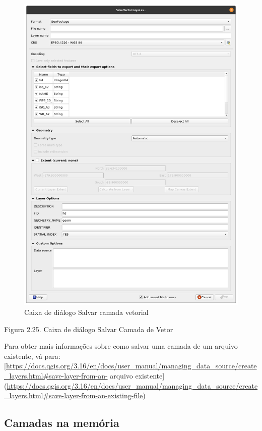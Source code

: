 \documentclass[
]{krantz}
\begin{document}
\begin{figure}
\centering
\includegraphics{media/modulo2/save-vector.png}
\caption{Caixa de diálogo Salvar camada vetorial}
\end{figure}

Figura 2.25. Caixa de diálogo Salvar Camada de Vetor

Para obter mais informações sobre como salvar uma camada de um arquivo existente, vá para: {[}\url{https://docs.qgis.org/3.16/en/docs/user_manual/managing_data_source/create_layers.html\#save-layer-from-an-} arquivo existente{]} (\url{https://docs.qgis.org/3.16/en/docs/user_manual/managing_data_source/create_layers.html\#save-layer-from-an-existing-file})

\hypertarget{camadas-na-memuxf3ria}{%
\subsection{Camadas na memória}\label{camadas-na-memuxf3ria}}
\end{document}
